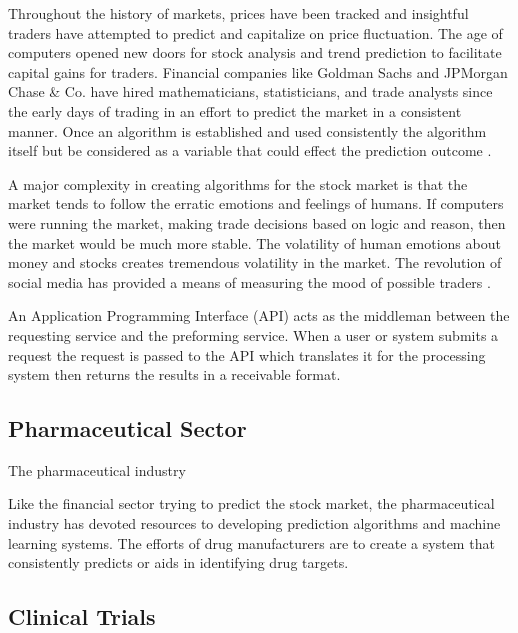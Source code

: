 \documentclass[sigconf]{acmart}
\begin{document}
Throughout the history of markets, prices have been tracked and insightful traders have attempted to predict and capitalize on price fluctuation. The age of computers opened new doors for stock analysis and trend prediction to facilitate capital gains for traders. Financial companies like Goldman Sachs and JPMorgan Chase \& Co. have hired mathematicians, statisticians, and trade analysts since the early days of trading in an effort to predict the market in a consistent manner. %
Once an algorithm is established and used consistently the algorithm itself but be considered as a variable that could effect the prediction outcome \cite{Hellstrom}. 

A major complexity in creating algorithms for the stock market is that the market tends to follow the erratic emotions and feelings of humans. If computers were running the market, making trade decisions based on logic and reason, then the market would be much more stable. The volatility of human emotions about money and stocks creates tremendous volatility in the market. The revolution of social media has provided a means of measuring the mood of possible traders \cite{BOLLEN}.

An Application Programming Interface (API) acts as the middleman between the requesting service and the preforming service. When a user or system submits a request the request is passed to the API which translates it for the processing system then returns the results in a receivable format. 


\subsection{Pharmaceutical Sector}
The pharmaceutical industry %

Like the financial sector trying to predict the stock market, the pharmaceutical industry has devoted resources to developing prediction algorithms and machine learning systems. The efforts of drug manufacturers are to create a system that consistently predicts or aids in identifying drug targets. %



\subsection{Clinical Trials}
\end{document}
